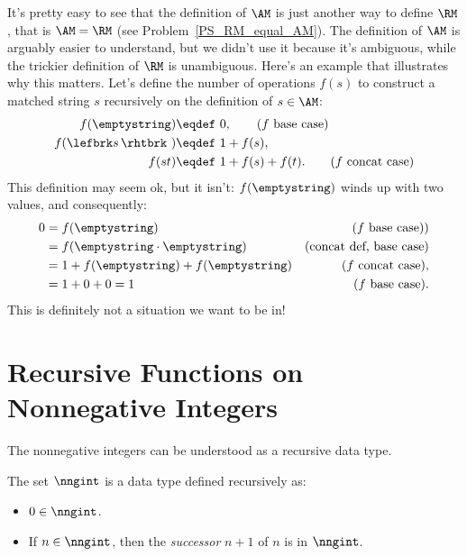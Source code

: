 It's pretty easy to see that the definition of $\AM$ is just another
way to define $\RM$, that is $\AM = \RM$ (see
Problem~\ref{PS_RM_equal_AM}).  The definition of $\AM$ is arguably
easier to understand, but we didn't use it because it's ambiguous,
while the trickier definition of $\RM$ is unambiguous.  Here's an
example that illustrates why this matters.  Let's define the number of
operations $f(s)$ to construct a matched string $s$ recursively on the
definition of $s \in \AM$:
\begin{align*}
  f(\emptystring)        & \eqdef\ 0, \tag{$f$ base case}\\
  f(\lefbrk s\,\rhtbrk\ ) & \eqdef\ 1+ f(s), \\
  f(st)                  & \eqdef\ 1+ f(s) +f(t).\tag{$f$ concat case}
\end{align*}
This definition may seem ok, but it isn't:
$f(\emptystring)$ winds up with two values, and consequently:
\begin{align*}
0 & = f(\emptystring) & \text{($f$ base case))}\\
  & = f(\emptystring \cdot \emptystring) & \text{(concat def, base case)} \\
                & = 1 + f(\emptystring) + f(\emptystring)
                      &  \text{($f$ concat case)},\\
                & = 1 + 0 + 0 = 1
                      & \text{($f$ base case)}.
\end{align*}
This is definitely not a situation we want to be in!

\begin{problems}

\practiceproblems
{}

\classproblems
{}

\homeworkproblems
{}

\examproblems
{}
\end{problems}

\section{Recursive Functions on Nonnegative Integers}

The nonnegative integers can be understood as a recursive data type.
\begin{definition}\label{0succ}
The set $\nngint$ is a data type defined recursively as:
\begin{itemize}
\item $0 \in \nngint$.
\item If $n \in \nngint$, then the \emph{successor} $n+1$ of $n$ is in
$\nngint$.
\end{itemize}

\end{definition}

